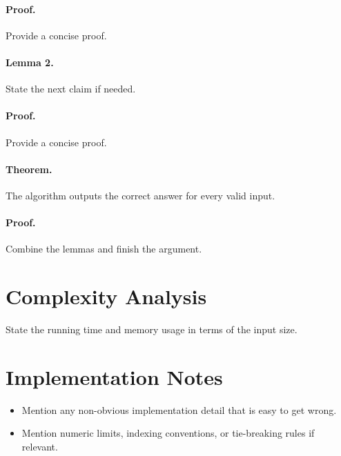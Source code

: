 \documentclass[11pt]{article}
\begin{document}
\paragraph{Proof.}
Provide a concise proof.

\paragraph{Lemma 2.}
State the next claim if needed.

\paragraph{Proof.}
Provide a concise proof.

\paragraph{Theorem.}
The algorithm outputs the correct answer for every valid input.

\paragraph{Proof.}
Combine the lemmas and finish the argument.

\section*{Complexity Analysis}

State the running time and memory usage in terms of the input size.

\section*{Implementation Notes}

\begin{itemize}[leftmargin=*]
    \item Mention any non-obvious implementation detail that is easy to get wrong.
    \item Mention numeric limits, indexing conventions, or tie-breaking rules if relevant.
\end{itemize}
\end{document}
